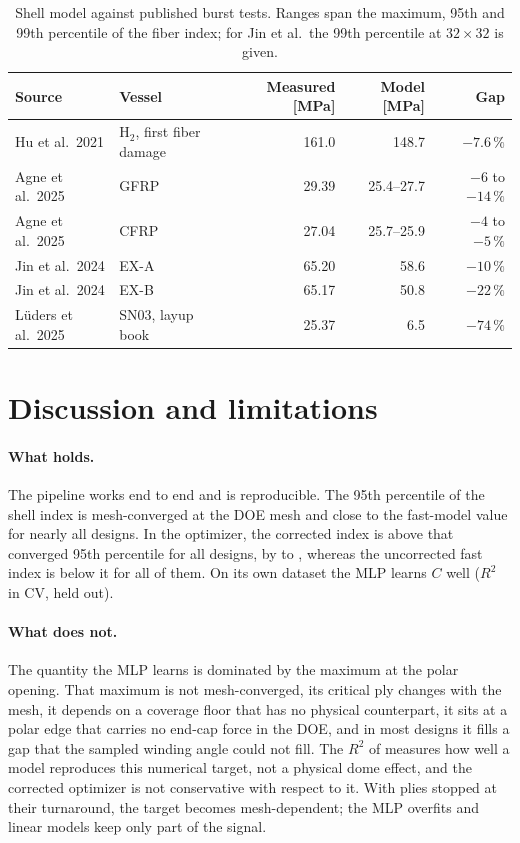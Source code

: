 \documentclass[11pt]{article}
\begin{document}
\begin{table}[t]
\centering
\caption{Shell model against published burst tests. Ranges span the maximum, 95th and 99th percentile of the fiber index; for Jin et al.\ the 99th percentile at $32\times32$ is given.}
\label{tab:bench}
\small
\begin{tabular}{llrrr}
\toprule
Source & Vessel & Measured [MPa] & Model [MPa] & Gap \\
\midrule
Hu et al.\ 2021 \cite{Hu2021} & H$_2$, first fiber damage & 161.0 & 148.7 & $-7.6\,\%$ \\
Agne et al.\ 2025 \cite{Agne2025} & GFRP & 29.39 & 25.4--27.7 & $-6$ to $-14\,\%$ \\
Agne et al.\ 2025 \cite{Agne2025} & CFRP & 27.04 & 25.7--25.9 & $-4$ to $-5\,\%$ \\
Jin et al.\ 2024 \cite{Jin2022} & EX-A & 65.20 & 58.6 & $-10\,\%$ \\
Jin et al.\ 2024 \cite{Jin2022} & EX-B & 65.17 & 50.8 & $-22\,\%$ \\
L\"uders et al.\ 2025 \cite{Lueders2025} & SN03, layup book & 25.37 & 6.5 & $-74\,\%$ \\
\bottomrule
\end{tabular}
\end{table}

\section{Discussion and limitations}
\paragraph{What holds.} The pipeline works end to end and is reproducible. The 95th percentile of the shell index is mesh-converged at the DOE mesh and close to the fast-model value for nearly all designs. In the optimizer, the corrected index is above that converged 95th percentile for all \NgaDesigns{} designs, by \GaMarginMin{} to \GaMarginMax{}, whereas the uncorrected fast index is below it for all of them. On its own dataset the MLP learns $C$ well ($R^2$ \RtwoCvMlp{} in CV, \RtwoEvalMlp{} held out).

\paragraph{What does not.} The quantity the MLP learns is dominated by the maximum at the polar opening. That maximum is not mesh-converged, its critical ply changes with the mesh, it depends on a coverage floor that has no physical counterpart, it sits at a polar edge that carries no end-cap force in the DOE, and in most designs it fills a gap that the sampled winding angle could not fill. The $R^2$ of \RtwoCvMlp{} measures how well a model reproduces this numerical target, not a physical dome effect, and the corrected optimizer is not conservative with respect to it. With plies stopped at their turnaround, the target becomes mesh-dependent; the MLP overfits and linear models keep only part of the signal.
\end{document}
